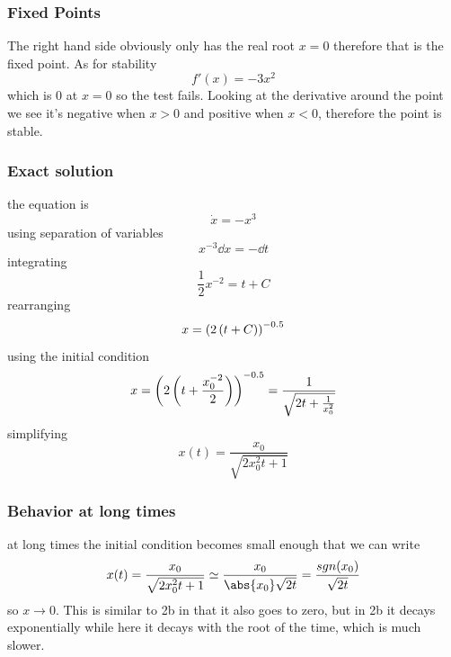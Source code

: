 \subsubsection{Fixed Points}
The right hand side obviously only has the real root \(x=0\) therefore that is the fixed point. As for stability
\begin{equation}
	f'(x) = -3x^2
\end{equation}
which is 0 at \(x=0\) so the test fails. Looking at the derivative around the point we see it's negative when \(x>0\) and positive when \(x<0\), therefore the point is stable.
\subsubsection{Exact solution}
the equation is
\begin{equation}
	\dot{x} = -x^3
\end{equation}
using separation of variables
\begin{equation}
	x^{-3}\dd{x} = -\dd{t}
\end{equation}
integrating
\begin{equation}
	\frac{1}{2}x^{-2} = t + C
\end{equation}
rearranging
\begin{equation}
	x = \left(2\left(t+C\right)\right)^{-0.5}
\end{equation}
using the initial condition
\begin{equation}
	x = \left(2\left(t+\frac{x_0^{-2}}{2}\right)\right)^{-0.5} = \frac{1}{\sqrt{2t+\frac{1}{x_0^2}}}
\end{equation}
simplifying
\begin{equation}
	x(t) = \frac{x_0}{\sqrt{2x_0^2 t + 1}}
\end{equation}
\subsubsection{Behavior at long times}
at long times the initial condition becomes small enough that we can write
\begin{equation}
	x(t) = \frac{x_0}{\sqrt{2x_0^2 t + 1}} \simeq \frac{x_0}{\abs{x_0}\sqrt{2t}} = \frac{sgn(x_0)}{\sqrt{2t}}
\end{equation}
so \(x\rightarrow 0\). This is similar to 2b in that it also goes to zero, but in 2b it decays exponentially while here it decays with the root of the time, which is much slower.